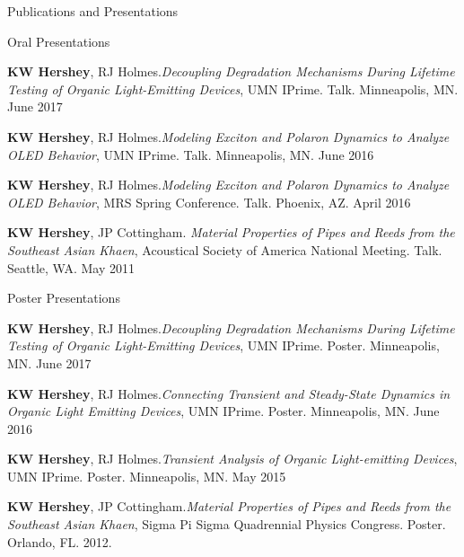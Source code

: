 \documentclass{resume} %
\begin{document}
\begin{rSection}{Publications and Presentations}
\begin{rSubsection}{Oral Presentations}{}{}{}
\item \textbf{KW Hershey}, RJ Holmes.{\em Decoupling Degradation Mechanisms During Lifetime Testing of Organic Light-Emitting Devices}, UMN IPrime. Talk. Minneapolis, MN. June 2017 
\item \textbf{KW Hershey}, RJ Holmes.{\em Modeling Exciton and Polaron Dynamics to Analyze OLED Behavior}, UMN IPrime. Talk. Minneapolis, MN. June 2016 
\item \textbf{KW Hershey}, RJ Holmes.{\em Modeling Exciton and Polaron Dynamics to Analyze OLED Behavior}, MRS Spring Conference. Talk. Phoenix, AZ. April 2016 
\item \textbf{KW Hershey}, JP Cottingham. {\em Material Properties of Pipes and Reeds from the Southeast Asian Khaen}, Acoustical Society of America National Meeting. Talk. Seattle, WA. May 2011 
\end{rSubsection}
\begin{rSubsection}{Poster Presentations}{}{}{}
\item \textbf{KW Hershey}, RJ Holmes.{\em Decoupling Degradation Mechanisms During Lifetime Testing of Organic Light-Emitting Devices}, UMN IPrime. Poster. Minneapolis, MN. June 2017 
\item \textbf{KW Hershey}, RJ Holmes.{\em Connecting Transient and Steady-State Dynamics in Organic Light Emitting Devices}, UMN IPrime. Poster. Minneapolis, MN. June 2016 
\item \textbf{KW Hershey}, RJ Holmes.{\em Transient Analysis of Organic Light-emitting Devices}, UMN IPrime. Poster. Minneapolis, MN. May 2015 
\item \textbf{KW Hershey}, JP Cottingham.{\em Material Properties of Pipes and Reeds from the Southeast Asian Khaen}, Sigma Pi Sigma Quadrennial Physics Congress. Poster. Orlando, FL. 2012.

\end{rSubsection}
\end{rSection}
\end{document}
